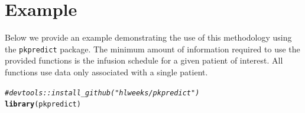 \documentclass{article}\usepackage[]{graphicx}\usepackage[]{color}
\makeatletter
\newcommand{\hlcom}[1]{\textcolor[rgb]{0.678,0.584,0.686}{\textit{#1}}}%
\newcommand{\hlstd}[1]{\textcolor[rgb]{0.345,0.345,0.345}{#1}}%
\newcommand{\hlkwd}[1]{\textcolor[rgb]{0.737,0.353,0.396}{\textbf{#1}}}%
\newenvironment{kframe}{%
 \def\at@end@of@kframe{}%
 \ifinner\ifhmode%
  \def\at@end@of@kframe{\end{minipage}}%
  \begin{minipage}{\columnwidth}%
 \fi\fi%
 \def\FrameCommand##1{\hskip\@totalleftmargin \hskip-\fboxsep
 \colorbox{shadecolor}{##1}\hskip-\fboxsep
     \hskip-\linewidth \hskip-\@totalleftmargin \hskip\columnwidth}%
 \MakeFramed {\advance\hsize-\width
   \@totalleftmargin\z@ \linewidth\hsize
   \@setminipage}}%
 {\par\unskip\endMakeFramed%
 \at@end@of@kframe}
\newenvironment{knitrout}{}{} %
\makeatother
\begin{document}




%


\section{Example}

Below we provide an example demonstrating the use of this methodology using the \texttt{pkpredict} package. The minimum amount of information required to use the provided functions is the infusion schedule for a given patient of interest. All functions use data only associated with a single patient.


\begin{knitrout}
\color{fgcolor}\begin{kframe}
\begin{alltt}
\hlcom{# devtools::install_github("hlweeks/pkpredict")}
\hlkwd{library}\hlstd{(pkpredict)}
\end{alltt}
\end{kframe}
\end{knitrout}
\end{document}

